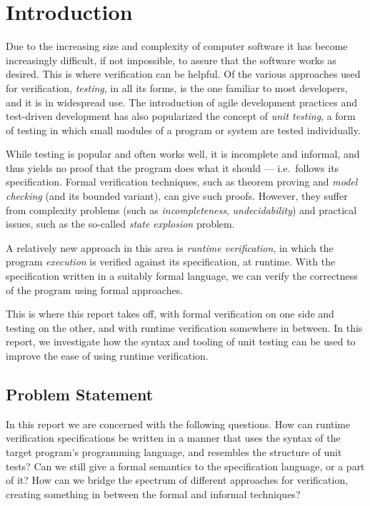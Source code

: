 
\pagestyle{newchap}
\chapter{Introduction} \label{chapter-introduction}

Due to the increasing size and complexity of computer software it has become
increasingly difficult, if not impossible, to assure that the software
works as desired. This is where verification can be helpful. Of the various
approaches used for verification, \textit{testing}, in all its forms, is the
one familiar to most developers, and it is in widespread use. The introduction
of agile development practices and test-driven development has also popularized
the concept of \textit{unit testing}, a form of testing in which small modules
of a program or system are tested individually.

While testing is popular and often works well, it is incomplete and informal,
and thus yields no proof that the program does what it should --- i.e.\ follows
its specification. Formal verification techniques, such as theorem proving and
\textit{model checking} (and its bounded variant), can give such proofs.
However, they suffer from complexity problems (such as \textit{incompleteness},
\textit{undecidability}) and practical issues, such as the so-called
\textit{state explosion} problem.

A relatively new approach in this area is \textit{runtime verification}, in
which the program \textit{execution} is verified against its specification, at
runtime. With the specification written in a suitably formal language, we can
verify the correctness of the program using formal approaches.

This is where this report takes off, with formal verification on one side and
testing on the other, and with runtime verification somewhere in between. In
this report, we investigate how the syntax and tooling of unit testing can be
used to improve the ease of using runtime verification.


\section{Problem Statement} \label{section-problem-statement}

In this report we are concerned with the following questions. How can runtime
verification specifications be written in a manner that uses the syntax of the
target program's programming language, and resembles the structure of unit
tests? Can we still give a formal semantics to the specification language, or a
part of it? How can we bridge the spectrum of different approaches for
verification, creating something in between the formal and informal techniques?


